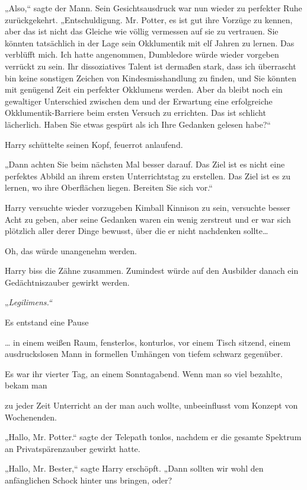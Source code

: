 {„Also,“ sagte der Mann. Sein Gesichtsausdruck war nun wieder zu perfekter Ruhe zurückgekehrt. „Entschuldigung. Mr. Potter, es ist gut ihre Vorzüge zu kennen, aber das ist nicht das Gleiche wie völlig vermessen auf sie zu vertrauen. Sie könnten tatsächlich in der Lage sein Okklumentik mit elf Jahren zu lernen. Das verblüfft mich. Ich hatte angenommen, Dumbledore würde wieder vorgeben verrückt zu sein. Ihr dissoziatives Talent ist dermaßen stark, dass ich überrascht bin keine sonstigen Zeichen von Kindesmisshandlung zu finden, und Sie könnten mit genügend Zeit ein perfekter Okklumens werden. Aber da bleibt noch ein gewaltiger Unterschied zwischen dem und der Erwartung eine erfolgreiche Okklumentik-Barriere beim ersten Versuch zu errichten. Das ist schlicht lächerlich. Haben Sie etwas gespürt als ich Ihre Gedanken gelesen habe?“

Harry schüttelte seinen Kopf, feuerrot anlaufend.

„Dann achten Sie beim nächsten Mal besser darauf. Das Ziel ist es nicht eine perfektes Abbild an ihrem ersten Unterrichtstag zu erstellen. Das Ziel ist es zu lernen, wo ihre Oberflächen liegen. Bereiten Sie sich vor.“

Harry versuchte wieder vorzugeben Kimball Kinnison zu sein, versuchte besser Acht zu geben, aber seine Gedanken waren ein wenig zerstreut und er war sich plötzlich aller derer Dinge bewusst, über die er nicht nachdenken sollte…

Oh, das würde unangenehm werden.

Harry biss die Zähne zusammen. Zumindest würde auf den Ausbilder danach ein Gedächtniszauber gewirkt werden.

„\emph{Legilimens.“}

Es entstand eine Pause \later

… in einem weißen Raum, fensterlos, konturlos, vor einem Tisch sitzend, einem ausdruckslosen Mann in formellen Umhängen von tiefem schwarz gegenüber.

Es war ihr vierter Tag, an einem Sonntagabend. Wenn man so viel bezahlte, bekam man

zu jeder Zeit Unterricht an der man auch wollte, unbeeinflusst vom Konzept von Wochenenden.

„Hallo, Mr. Potter.“ sagte der Telepath tonlos, nachdem er die gesamte Spektrum an Privatspärenzauber gewirkt hatte.

„Hallo, Mr. Bester,“ sagte Harry erschöpft. „Dann sollten wir wohl den anfänglichen Schock hinter uns bringen, oder?

}
